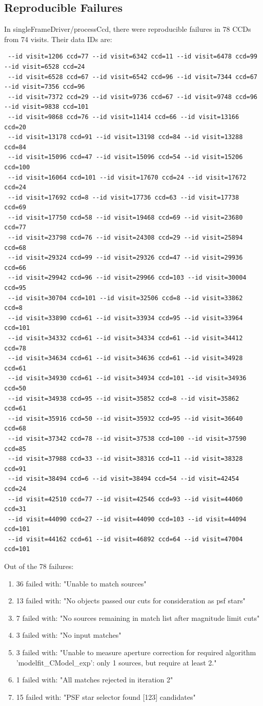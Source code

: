 \documentclass[DM,authoryear,toc]{lsstdoc}
\begin{document}
\subsection{Reproducible Failures}
In singleFrameDriver/processCcd, there were reproducible failures in 78 CCDs from 74 visits. Their data IDs are:

\begin{verbatim}
 --id visit=1206 ccd=77 --id visit=6342 ccd=11 --id visit=6478 ccd=99 --id visit=6528 ccd=24
 --id visit=6528 ccd=67 --id visit=6542 ccd=96 --id visit=7344 ccd=67 --id visit=7356 ccd=96
 --id visit=7372 ccd=29 --id visit=9736 ccd=67 --id visit=9748 ccd=96 --id visit=9838 ccd=101
 --id visit=9868 ccd=76 --id visit=11414 ccd=66 --id visit=13166 ccd=20
 --id visit=13178 ccd=91 --id visit=13198 ccd=84 --id visit=13288 ccd=84
 --id visit=15096 ccd=47 --id visit=15096 ccd=54 --id visit=15206 ccd=100
 --id visit=16064 ccd=101 --id visit=17670 ccd=24 --id visit=17672 ccd=24
 --id visit=17692 ccd=8 --id visit=17736 ccd=63 --id visit=17738 ccd=69
 --id visit=17750 ccd=58 --id visit=19468 ccd=69 --id visit=23680 ccd=77
 --id visit=23798 ccd=76 --id visit=24308 ccd=29 --id visit=25894 ccd=68
 --id visit=29324 ccd=99 --id visit=29326 ccd=47 --id visit=29936 ccd=66
 --id visit=29942 ccd=96 --id visit=29966 ccd=103 --id visit=30004 ccd=95
 --id visit=30704 ccd=101 --id visit=32506 ccd=8 --id visit=33862 ccd=8
 --id visit=33890 ccd=61 --id visit=33934 ccd=95 --id visit=33964 ccd=101
 --id visit=34332 ccd=61 --id visit=34334 ccd=61 --id visit=34412 ccd=78
 --id visit=34634 ccd=61 --id visit=34636 ccd=61 --id visit=34928 ccd=61
 --id visit=34930 ccd=61 --id visit=34934 ccd=101 --id visit=34936 ccd=50
 --id visit=34938 ccd=95 --id visit=35852 ccd=8 --id visit=35862 ccd=61
 --id visit=35916 ccd=50 --id visit=35932 ccd=95 --id visit=36640 ccd=68
 --id visit=37342 ccd=78 --id visit=37538 ccd=100 --id visit=37590 ccd=85
 --id visit=37988 ccd=33 --id visit=38316 ccd=11 --id visit=38328 ccd=91
 --id visit=38494 ccd=6 --id visit=38494 ccd=54 --id visit=42454 ccd=24
 --id visit=42510 ccd=77 --id visit=42546 ccd=93 --id visit=44060 ccd=31
 --id visit=44090 ccd=27 --id visit=44090 ccd=103 --id visit=44094 ccd=101
 --id visit=44162 ccd=61 --id visit=46892 ccd=64 --id visit=47004 ccd=101
\end{verbatim}

Out of the 78 failures:
\begin{enumerate}
\item
36 failed with: "Unable to match sources"
\item
13 failed with: "No objects passed our cuts for consideration as psf stars"
\item
7 failed with: "No sources remaining in match list after magnitude limit cuts"
\item
3 failed with: "No input matches"
\item
3 failed with: "Unable to measure aperture correction for required algorithm 'modelfit{\_}CModel{\_}exp': only 1 sources, but require at least 2."
\item
1 failed with: "All matches rejected in iteration 2"
\item
15 failed with: "PSF star selector found [123] candidates"
\end{enumerate}
\end{document}
